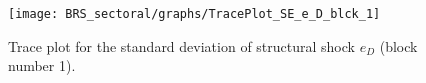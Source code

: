 \begin{figure}[H]
\centering
  \texttt{[image: BRS\_sectoral/graphs/TracePlot\_SE\_e\_D\_blck\_1]}\\
    \caption{Trace plot for the standard deviation of structural shock ${e_D}$ (block number 1).}
\end{figure}
